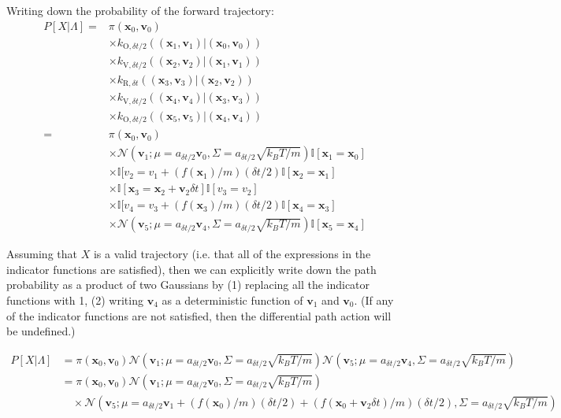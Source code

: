 \documentclass[11pt]{article}
\newcommand{\x}{\mathbf{x}}
\newcommand{\vel}{\mathbf{v}}
\newcommand{\ind}{\mathbb{I}} %
\newcommand{\pair}[1]{(\x_{#1}, \vel_{#1})}
\begin{document}
Writing down the probability of the forward trajectory:
$$\begin{aligned}
P[X | \Lambda] =
&\pi \pair{0}   		\\								%
&\times k_{\text{O}, \delta t /2}(\pair{1} | \pair{0})\\
&\times k_{\text{V}, \delta t / 2}(\pair{2} | \pair{1})	 \\
&\times k_{\text{R}, \delta t}(\pair{3} | \pair{2})	 \\
&\times k_{\text{V}, \delta t / 2}(\pair{4} | \pair{3})	 \\
&\times k_{\text{O}, \delta t /2}(\pair{5} | \pair{4})\\
= &\pi \pair{0}  \\
&\times \mathcal{N}(\vel_{1} ; \mu=a_{\delta t / 2} \vel_0, \Sigma=a_{\delta t / 2} \sqrt{k_B T / m})
\ind[ \x_1 = \x_0 ]\\
&\times \ind[ v_2 = v_1 + (f(\x_1) / m) (\delta t / 2)
\ind[ \x_2 = \x_1 ]\\
&\times \ind[ \x_3 = \x_2 + \vel_2 \delta t]
\ind[ v_3 = v_2]\\
&\times \ind[ v_4 = v_3 + (f(\x_3) / m) (\delta t / 2)
\ind[ \x_4 = \x_3 ]\\
&\times \mathcal{N}(\vel_{5} ; \mu=a_{\delta t / 2} \vel_4, \Sigma=a_{\delta t / 2} \sqrt{k_B T / m})
\ind[ \x_5 = \x_4 ]
\end{aligned}
$$

Assuming that $X$ is a valid trajectory (i.e. that all of the expressions in the indicator functions are satisfied), then we can explicitly write down the path probability as a product of two Gaussians by (1) replacing all the indicator functions with 1, (2) writing $\vel_4$ as a deterministic function of $\vel_{1}$ and $\vel_0$. (If any of the indicator functions are not satisfied, then the differential path action will be undefined.)

$$\begin{aligned}
P[X | \Lambda] &=
\pi \pair{0} 
\mathcal{N}(\vel_{1} ; \mu=a_{\delta t / 2} \vel_0, \Sigma=a_{\delta t / 2} \sqrt{k_B T / m})
\mathcal{N}(\vel_{5} ; \mu=a_{\delta t / 2} \vel_4, \Sigma=a_{\delta t / 2} \sqrt{k_B T / m})\\
&=
\pi \pair{0} 
\mathcal{N}(\vel_{1} ; \mu=a_{\delta t / 2} \vel_0, \Sigma=a_{\delta t / 2} \sqrt{k_B T / m})\\
&\quad \times \mathcal{N}(\vel_{5} ; \mu=a_{\delta t / 2} \vel_1 + (f(\x_0) / m) (\delta t / 2) + (f(\x_0 + \vel_2 \delta t) / m) (\delta t / 2), \Sigma=a_{\delta t / 2} \sqrt{k_B T / m})
\end{aligned}$$
\end{document}
